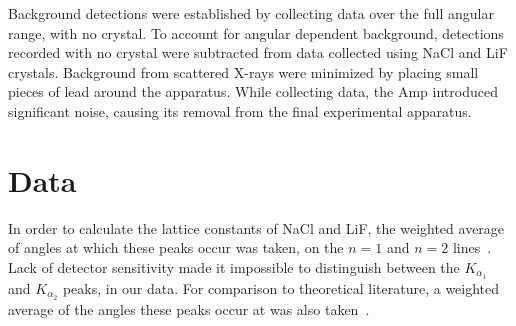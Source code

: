\documentclass[aps,prl,twocolumn,superscriptaddress]{revtex4-1}
\begin{document}
Background detections were established by collecting data over the full angular range, with no crystal.  To account for angular dependent background, detections recorded with no crystal were subtracted from data collected using NaCl and LiF crystals.  
Background from scattered X-rays were minimized by placing small pieces of lead around the apparatus.  While collecting data, the Amp introduced significant noise, causing its removal from the final experimental apparatus.

\section{Data}

In order to calculate the lattice constants of NaCl and LiF, the weighted average of angles at which these peaks occur was taken, on the $n=1$ and $n=2$ lines~\cite{she}.  Lack of detector sensitivity made it impossible to distinguish between the $K_{\alpha_{1}}$ and $K_{\alpha_{2}}$ peaks, in our data.  For comparison to theoretical literature, a weighted average of the angles these peaks occur at was also taken~\cite{daichi}.
\end{document}
